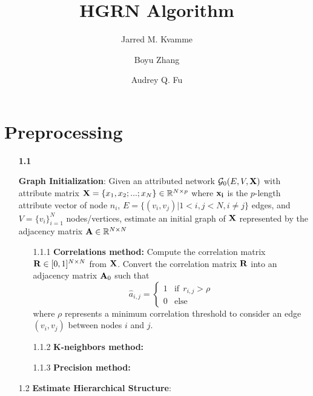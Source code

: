 \documentclass[a4paper,12pt]{article}
\begin{document}
	\begin{titlepage}
		\title{HGRN Algorithm}
		\author[1]{Jarred M. Kvamme}
		\author[2]{Boyu Zhang}
		\author[1,3]{Audrey Q. Fu}
		\maketitle
	\end{titlepage}
	
	
	\newpage
	\tableofcontents{}
	\listoftables
	\listoffigures
	\newpage
	
	
	
	
	
	\section{Preprocessing}
	\begin{itemize}
		\item[\bf 1.1]{\textbf{Graph Initialization}: Given an attributed network $\mathcal{G}_0(E,V,{\bf X})$ with attribute matrix ${\bf X} =\{x_1, x_2;...;x_N\} \in \mathbb{R}^{N \times p}$ where $\bf x_i$ is the $p$-length attribute vector of node $n_i$, $E = \{ (v_i, v_j)| 1<i, j<N, i\neq j\}$ edges, and $V = \{v_i\}_{i=1}^N$ nodes/vertices, estimate an initial graph of $\bf X$ represented by the adjacency matrix ${\bf A} \in \mathbb{R}^{N\times N}$ 
		\begin{itemize}
			\item[1.1.1]{\textbf{Correlations method:} Compute the correlation matrix ${\bf R}\in[0,1]^{N\times N}$ from $\bf X$. Convert the correlation matrix $\bf R$ into an adjacency matrix ${\bf A}_0$ such that 
				\[ \hat{a}_{i,j} = \begin{cases}
					1 & \text{if} \ \  r_{i,j} > \rho \\
					0 & \text{else}
				\end{cases} \] 
			where $\rho$ represents a minimum correlation threshold to consider an edge $(v_i, v_j)$ between nodes $i$ and $j$.}
			
			\item[1.1.2]{\textbf{K-neighbors method:} }
			
			\item[1.1.3]{\textbf{Precision method:}}
		\end{itemize} }
	
	\item[1.2]{\textbf{Estimate Hierarchical Structure}:} 
		
	\end{itemize}
	
\end{document}
